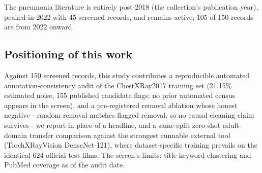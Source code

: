 The pneumonia literature is entirely post-2018 (the collection's publication year), peaked in 2022 with 45 screened records, and remains active; 105 of 150 records are from 2022 onward.\par

\subsection*{Positioning of this work}
Against 150 screened records, this study contributes a reproducible automated annotation-consistency audit of the ChestXRay2017 training set (21.15\% estimated noise, 155 published candidate flags; no prior automated census appears in the screen), and a pre-registered removal ablation whose honest negative - random removal matches flagged removal, so no causal cleaning claim survives - we report in place of a headline, and a same-split zero-shot adult-domain transfer comparison against the strongest runnable external tool (TorchXRayVision DenseNet-121), where dataset-specific training prevails on the identical 624 official test films. The screen's limits: title-keyword clustering and PubMed coverage as of the audit date.

